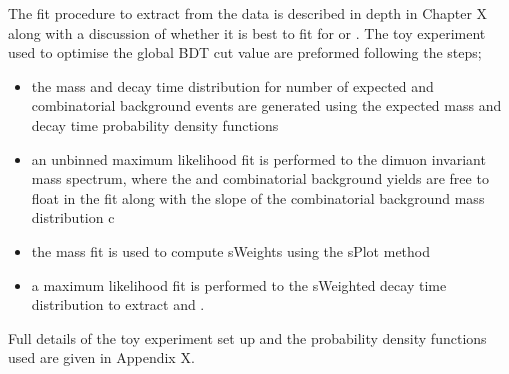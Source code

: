 The fit procedure to extract \tmumu from the data is described in depth in Chapter X along with a discussion of whether it is best to fit for \tmumu or \invtmumu. The toy experiment used to optimise the global BDT cut value are preformed following the steps;
\begin{itemize}
\item the mass and decay time distribution for number of expected \bsmumu and combinatorial background events are generated using the expected mass and decay time probability density functions
\item an unbinned maximum likelihood fit is performed to the dimuon invariant mass spectrum, where the \bsmumu and combinatorial background yields are free to float in the fit along with the slope of the combinatorial background mass distribution c
\item the mass fit is used to compute sWeights using the sPlot method \cite{Pivk:2004ty}
\item a maximum likelihood fit is performed to the sWeighted decay time distribution to extract \tmumu and \invtmumu. 
\end{itemize}
Full details of the toy experiment set up and the probability density functions used are given in Appendix X. 

